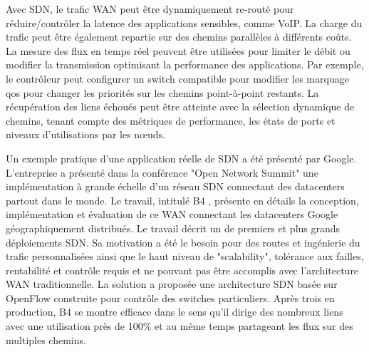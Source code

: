 Avec SDN, le trafic WAN peut être dynamiquement re-routé pour réduire/contrôler la latence des applications sensibles, comme VoIP. La charge du trafic peut être également repartie sur des chemins parallèles à différents coûts.
La mesure des flux en temps réel peuvent être utilisées pour limiter le débit ou modifier la transmission optimisant la performance des applications. Par exemple, le contrôleur peut configurer un switch compatible pour modifier les marquage \gls{qos} pour changer les priorités sur les chemins point-à-point restants.
La récupération des liens échoués peut être atteinte avec la sélection dynamique de chemins, tenant compte des métriques de performance, les états de ports et niveaux d'utilisations par les nœuds.

Un exemple pratique d'une application réelle de SDN a été présenté par Google. L'entreprise a présenté dans la conférence "Open Network Summit" \cite{googleONS} une implémentation à grande échelle d'un réseau SDN connectant des \glspl{datacenter} partout dans le monde. Le travail, intitulé B4 \cite{SDNWANB4}, présente en détails la conception, implémentation et évaluation de ce WAN connectant les \glspl{datacenter} Google géographiquement distribués. Le travail décrit un de premiers et plus grands déploiements SDN. Sa motivation a été le besoin pour des routes et ingénierie du trafic personnalisées ainsi que le haut niveau de "scalability", tolérance aux failles, rentabilité et contrôle requis et ne pouvant pas être accomplis avec l'architecture WAN traditionnelle. La solution a proposée une architecture SDN basée sur OpenFlow construite pour contrôle des switches particuliers. Après trois en production, B4 se montre efficace dans le sens qu'il dirige des nombreux liens avec une utilisation près de 100\% et au même temps partageant les flux sur des multiples chemins. \cite{SurveySDNApplications}


